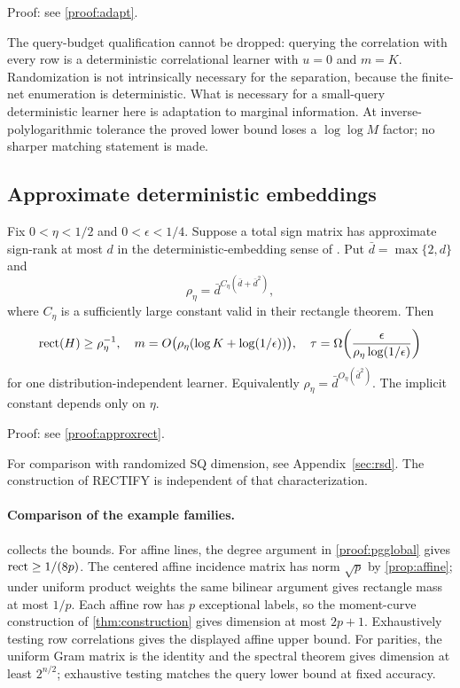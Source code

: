 \noindent Proof: see \cref{proof:adapt}.\par


The query-budget qualification cannot be dropped: querying the correlation with every row is a deterministic correlational learner with $u=0$ and $m=K$. Randomization is not intrinsically necessary for the separation, because the finite-net enumeration is deterministic. What is necessary for a small-query deterministic learner here is adaptation to marginal information. At inverse-polylogarithmic tolerance the proved lower bound loses a $\log\log M$ factor; no sharper matching statement is made.

\subsection{Approximate deterministic embeddings}
\begin{corollary}\label{cor:approxrect}
Fix $0<\eta<1/2$ and $0<\epsilon<1/4$. Suppose a total sign matrix has approximate sign-rank at most $d$ in the deterministic-embedding sense of \citet{BHKR26}. Put $\bar d=\max\{2,d\}$ and
\[
 \rho_\eta=\bar d^{C_\eta(\bar d+\bar d^2)},
\]
where $C_\eta$ is a sufficiently large constant valid in their rectangle theorem. Then
\[
 \operatorname{rect}(H)\ge\rho_\eta^{-1},\quad
 m=O\bigl(\rho_\eta(\log K+\log(1/\epsilon))\bigr),\quad
 \tau=\Omega\!\left(\frac{\epsilon}{\rho_\eta\log(1/\epsilon)}\right)
\]
for one distribution-independent learner. Equivalently $\rho_\eta=\bar d^{O_\eta(\bar d^2)}$. The implicit constant depends only on $\eta$.
\end{corollary}

\noindent Proof: see \cref{proof:approxrect}.\par
For comparison with randomized SQ dimension, see Appendix~\ref{sec:rsd}. The construction of RECTIFY is independent of that characterization.

\paragraph{Comparison of the example families.}
 collects the bounds. For affine lines, the degree argument in \cref{proof:pgglobal} gives $\operatorname{rect}\ge1/(8p)$. The centered affine incidence matrix has norm $\sqrt p$ by \cref{prop:affine}; under uniform product weights the same bilinear argument gives rectangle mass at most $1/p$. Each affine row has $p$ exceptional labels, so the moment-curve construction of \cref{thm:construction} gives dimension at most $2p+1$. Exhaustively testing row correlations gives the displayed affine upper bound. For parities, the uniform Gram matrix is the identity and the spectral theorem gives dimension at least $2^{n/2}$; exhaustive testing matches the query lower bound at fixed accuracy.

